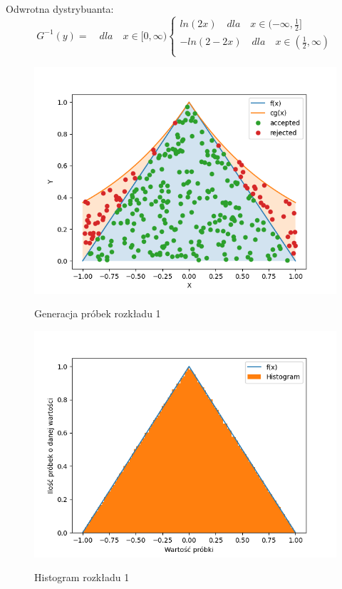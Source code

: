 \documentclass[12pt,a4paper]{article}
\begin{document}
  Odwrotna dystrybuanta:
  \begin{equation}
    G^{-1}(y) =   \quad dla \quad x  \in [0, \infty)
    \begin{cases}
      ln(2x) \quad dla \quad x  \in (-\infty, \frac{1}{2}]\\
      -ln(2-2x) \quad dla \quad x  \in (\frac{1}{2}, \infty)\\
    \end{cases} 
  \end{equation}

  \begin{figure}[H]
    \centering
    \includegraphics[height=0.4\textheight]{figures/Figure_23.png}
    \label{fig:23}
    \caption{Generacja próbek rozkładu 1}
  \end{figure}

  \begin{figure}[H]
    \centering
    \includegraphics[height=0.4\textheight]{figures/Figure_24.png}
    \label{fig:24}
    \caption{Histogram rozkładu 1}

  \end{figure}
\end{document}
